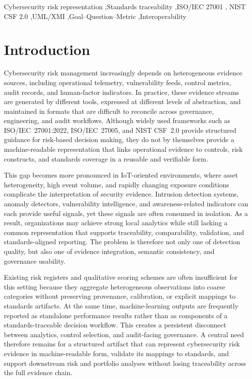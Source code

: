 \documentclass[preprint,12pt]{elsarticle}
\begin{document}
\begin{frontmatter}
\begin{keyword}
Cybersecurity risk representation \sep Standards traceability \sep ISO/IEC 27001 \sep
NIST CSF 2.0 \sep UML/XMI \sep Goal--Question--Metric \sep Interoperability
\end{keyword}

\end{frontmatter}
\clearpage
\hypersetup{pageanchor=true}

\section{Introduction}
\label{sec:introduction}

Cybersecurity risk management increasingly depends on heterogeneous evidence sources, including operational telemetry, vulnerability feeds, control metrics, audit records, and human-factor indicators. In practice, these evidence streams are generated by different tools, expressed at different levels of abstraction, and maintained in formats that are difficult to reconcile across governance, engineering, and audit workflows. Although widely used frameworks such as ISO/IEC~27001:2022, ISO/IEC~27005, and NIST CSF~2.0 provide structured guidance for risk-based decision making, they do not by themselves provide a machine-readable representation that links operational evidence to controls, risk constructs, and standards coverage in a reusable and verifiable form.

This gap becomes more pronounced in IoT-oriented environments, where asset heterogeneity, high event volume, and rapidly changing exposure conditions complicate the interpretation of security evidence. Intrusion detection systems, anomaly detectors, vulnerability intelligence, and awareness-related indicators can each provide useful signals, yet these signals are often consumed in isolation. As a result, organizations may achieve strong local analytics while still lacking a common representation that supports traceability, comparability, validation, and standards-aligned reporting. The problem is therefore not only one of detection quality, but also one of evidence integration, semantic consistency, and governance usability.

Existing risk registers and qualitative scoring schemes are often insufficient for this setting because they aggregate heterogeneous observations into coarse categories without preserving provenance, calibration, or explicit mappings to standards artifacts. At the same time, machine-learning outputs are frequently reported as standalone performance results rather than as components of a standards-traceable decision workflow. This creates a persistent disconnect between analytics, control selection, and audit-facing governance. A central need therefore remains for a structured artifact that can represent cybersecurity risk evidence in machine-readable form, validate its mappings to standards, and support downstream risk and portfolio analyses without losing traceability across the full evidence chain.
\end{document}
